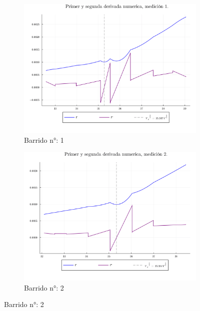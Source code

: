 
\begin{figure}[H]
\centering
\begin{subfigure}[b]{0.49\textwidth}
	\centering
	\includegraphics[width=\linewidth]{img/potderps1.png}
	\caption{Barrido n°: 1}
	\label{fig:potderps1}
\end{subfigure}
\hfill
\begin{subfigure}[b]{0.49\textwidth}
	\centering
	\includegraphics[width=\linewidth]{img/potderps2.png}
	\caption{Barrido n°: 2}
	\label{fig:potderps2}
\end{subfigure}

\end{figure}

